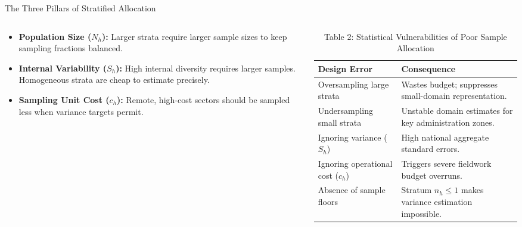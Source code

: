 \documentclass[10pt, aspectratio=169]{beamer}
\begin{document}
  \begin{frame}{The Three Pillars of Stratified Allocation}
      \begin{columns}
          \begin{column}{0.45\textwidth}
              \begin{itemize}
                  \item \textbf{Population Size ($N_h$):} Larger strata require larger sample sizes to keep sampling fractions balanced.
                  \item \textbf{Internal Variability ($S_h$):} High internal diversity requires larger samples. Homogeneous strata are cheap to estimate precisely.
                  \item \textbf{Sampling Unit Cost ($c_h$):} Remote, high-cost sectors should be sampled less when variance targets permit.
              \end{itemize}
          \end{column}
          \begin{column}{0.55\textwidth}
              \begin{table}
                  \caption{Table 2: Statistical Vulnerabilities of Poor Sample Allocation}
                  \tiny
                  \begin{tabularx}{\textwidth}{lX}
                      \toprule
                      \textbf{Design Error} & \textbf{Consequence} \\
                      \midrule
                      Oversampling large strata & Wastes budget; suppresses small-domain representation. \\
                      \midrule
                      Undersampling small strata & Unstable domain estimates for key administration zones. \\
                      \midrule
                      Ignoring variance ($S_h$) & High national aggregate standard errors. \\
                      \midrule
                      Ignoring operational cost ($c_h$) & Triggers severe fieldwork budget overruns. \\
                      \midrule
                      Absence of sample floors & Stratum $n_h \le 1$ makes variance estimation impossible. \\
                      \bottomrule
                  \end{tabularx}
              \end{table}
          \end{column}
      \end{columns}
  \end{frame}
  
\end{document}
